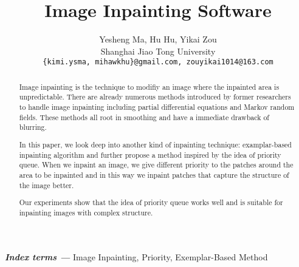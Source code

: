 \documentclass[10pt,twocolumn,letterpaper]{article}
\providecommand{\keywords}[1]{\textbf{\textit{Index terms ---}} #1}
\begin{document}
\title{Image Inpainting Software}

\author{Yesheng Ma, Hu Hu, Yikai Zou\\
Shanghai Jiao Tong University\\
{\tt\small \{kimi.ysma, mihawkhu\}@gmail.com, zouyikai1014@163.com}
}

\maketitle

\begin{abstract}
    Image inpainting is the technique to modifiy an image where the 
    inpainted area is unpredictable. There are already numerous methods
    introduced by former researchers to handle image inpainting including
    partial differential equations and Markov random fields. These methods
    all root in smoothing and have a immediate drawback of blurring.

    In this paper, we look deep into another kind of inpainting technique:
    examplar-based inpainting algorithm and further propose a method 
    inspired by the idea of priority queue. When we inpaint an image, we
    give different priority to the patches around the area to be inpainted
    and in this way we inpaint patches that capture the structure of the
    image better.

    Our experiments show that the idea of priority queue works well and
    is suitable for inpainting images with complex structure.
\end{abstract}

\keywords{Image Inpainting, Priority, Exemplar-Based Method}










\newpage
{\small


}
\end{document}

